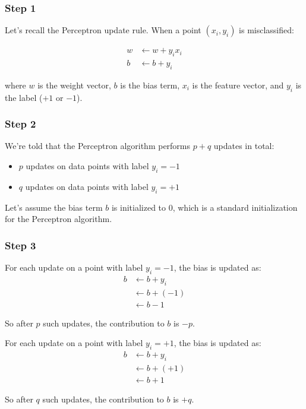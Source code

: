 \documentclass{article}
\begin{document}
\subsubsection*{Step 1}
\parbox{\textwidth}{
Let's recall the Perceptron update rule. When a point $(x_i, y_i)$ is misclassified:

\begin{align}
w &\leftarrow w + y_i x_i\\
b &\leftarrow b + y_i
\end{align}

where $w$ is the weight vector, $b$ is the bias term, $x_i$ is the feature vector, and $y_i$ is the label ($+1$ or $-1$).
}

\subsubsection*{Step 2}
\parbox{\textwidth}{
We're told that the Perceptron algorithm performs $p+q$ updates in total:
\begin{itemize}
    \item $p$ updates on data points with label $y_i = -1$
    \item $q$ updates on data points with label $y_i = +1$
\end{itemize}

Let's assume the bias term $b$ is initialized to 0, which is a standard initialization for the Perceptron algorithm.
}

\subsubsection*{Step 3}
\parbox{\textwidth}{
For each update on a point with label $y_i = -1$, the bias is updated as:
\begin{align}
b &\leftarrow b + y_i\\
&\leftarrow b + (-1)\\
&\leftarrow b - 1
\end{align}

So after $p$ such updates, the contribution to $b$ is $-p$.

For each update on a point with label $y_i = +1$, the bias is updated as:
\begin{align}
b &\leftarrow b + y_i\\
&\leftarrow b + (+1)\\
&\leftarrow b + 1
\end{align}

So after $q$ such updates, the contribution to $b$ is $+q$.
}
\end{document}
